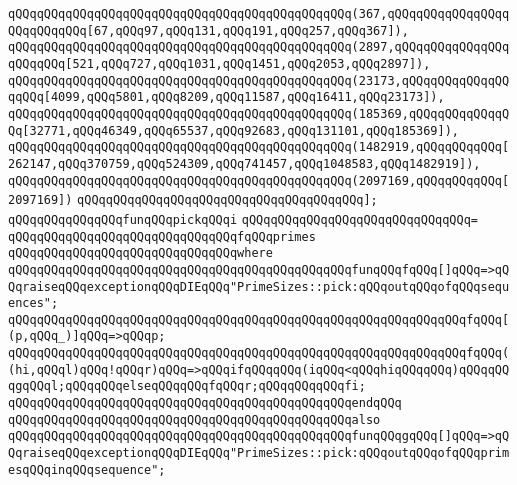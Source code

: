 \verb|qQQqqQQqqQQqqQQqqQQqqQQqqQQqqQQqqQQqqQQqqQQqqQQq(367,qQQqqQQqqQQqqQQqqQQqqQQqqQQq[67,qQQq97,qQQq131,qQQq191,qQQq257,qQQq367]),|\newline
\verb|qQQqqQQqqQQqqQQqqQQqqQQqqQQqqQQqqQQqqQQqqQQqqQQq(2897,qQQqqQQqqQQqqQQqqQQqqQQq[521,qQQq727,qQQq1031,qQQq1451,qQQq2053,qQQq2897]),|\newline
\verb|qQQqqQQqqQQqqQQqqQQqqQQqqQQqqQQqqQQqqQQqqQQqqQQq(23173,qQQqqQQqqQQqqQQqqQQq[4099,qQQq5801,qQQq8209,qQQq11587,qQQq16411,qQQq23173]),|\newline
\verb|qQQqqQQqqQQqqQQqqQQqqQQqqQQqqQQqqQQqqQQqqQQqqQQq(185369,qQQqqQQqqQQqqQQq[32771,qQQq46349,qQQq65537,qQQq92683,qQQq131101,qQQq185369]),|\newline
\verb|qQQqqQQqqQQqqQQqqQQqqQQqqQQqqQQqqQQqqQQqqQQqqQQq(1482919,qQQqqQQqqQQq[262147,qQQq370759,qQQq524309,qQQq741457,qQQq1048583,qQQq1482919]),|\newline
\verb|qQQqqQQqqQQqqQQqqQQqqQQqqQQqqQQqqQQqqQQqqQQqqQQq(2097169,qQQqqQQqqQQq[2097169])|\newline
\verb|qQQqqQQqqQQqqQQqqQQqqQQqqQQqqQQqqQQqqQQq];|\newline
\newline
\verb|qQQqqQQqqQQqqQQqfunqQQqpickqQQqi|\newline
\verb|qQQqqQQqqQQqqQQqqQQqqQQqqQQqqQQq=|\newline
\verb|qQQqqQQqqQQqqQQqqQQqqQQqqQQqqQQqfqQQqprimes|\newline
\verb|qQQqqQQqqQQqqQQqqQQqqQQqqQQqqQQqwhere|\newline
\verb|qQQqqQQqqQQqqQQqqQQqqQQqqQQqqQQqqQQqqQQqqQQqqQQqfunqQQqfqQQq[]qQQq=>qQQqraiseqQQqexceptionqQQqDIEqQQq"PrimeSizes::pick:qQQqoutqQQqofqQQqsequences";|\newline
\verb|qQQqqQQqqQQqqQQqqQQqqQQqqQQqqQQqqQQqqQQqqQQqqQQqqQQqqQQqqQQqqQQqfqQQq[(p,qQQq_)]qQQq=>qQQqp;|\newline
\verb|qQQqqQQqqQQqqQQqqQQqqQQqqQQqqQQqqQQqqQQqqQQqqQQqqQQqqQQqqQQqqQQqfqQQq((hi,qQQql)qQQq!qQQqr)qQQq=>qQQqifqQQqqQQq(iqQQq<qQQqhiqQQqqQQq)qQQqqQQqgqQQql;qQQqqQQqelseqQQqqQQqfqQQqr;qQQqqQQqqQQqfi;|\newline
\verb|qQQqqQQqqQQqqQQqqQQqqQQqqQQqqQQqqQQqqQQqqQQqqQQqendqQQq|\newline
\newline
\verb|qQQqqQQqqQQqqQQqqQQqqQQqqQQqqQQqqQQqqQQqqQQqqQQqalso|\newline
\verb|qQQqqQQqqQQqqQQqqQQqqQQqqQQqqQQqqQQqqQQqqQQqqQQqfunqQQqgqQQq[]qQQq=>qQQqraiseqQQqexceptionqQQqDIEqQQq"PrimeSizes::pick:qQQqoutqQQqofqQQqprimesqQQqinqQQqsequence";|\newline
